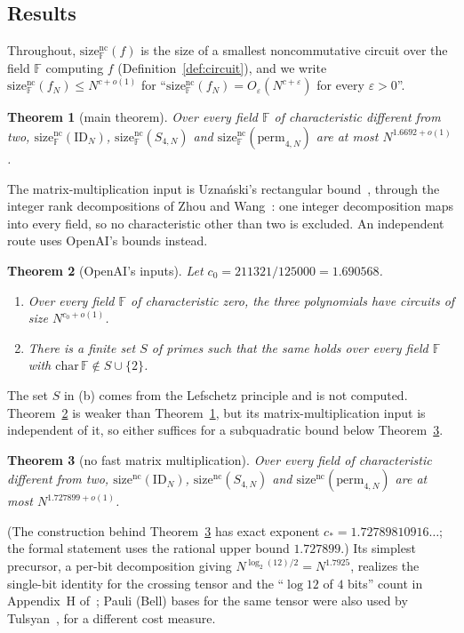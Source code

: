 \documentclass[11pt]{article}
\newtheorem{theorem}{Theorem}[section]
\theoremstyle{definition}
\theoremstyle{remark}
\newcommand{\F}{\mathbb{F}}
\newcommand{\ID}{\mathrm{ID}}
\newcommand{\size}{\mathrm{size}^{\mathrm{nc}}}
\begin{document}
\subsection{Results}
Throughout, $\size_\F(f)$ is the size of a smallest noncommutative circuit over the field $\F$ computing $f$
(Definition~\ref{def:circuit}), and we write $\size_\F(f_N)\le N^{c+o(1)}$ for
``$\size_\F(f_N)=O_\varepsilon(N^{c+\varepsilon})$ for every $\varepsilon>0$''.

\begin{theorem}[main theorem]\label{thm:main}
Over every field $\F$ of characteristic different from two, $\size_\F(\ID_N)$, $\size_\F(S_{4,N})$ and
$\size_\F(\mathrm{perm}_{4,N})$ are at most $N^{1.6692+o(1)}$.
\end{theorem}

The matrix-multiplication input is Uzna\'nski's rectangular bound~\cite{Uznanski2026}, through the integer rank
decompositions of Zhou and Wang~\cite{ZhouWang2026}: one integer decomposition maps into every field, so no
characteristic other than two is excluded. An independent route uses OpenAI's bounds instead.

\begin{theorem}[OpenAI's inputs]\label{thm:oairoute}
Let $c_0=211321/125000=1.690568$.
\begin{enumerate}[label=(\alph*)]
\item Over every field $\F$ of characteristic zero, the three polynomials have circuits of size $N^{c_0+o(1)}$.
\item There is a finite set $S$ of primes such that the same holds over every field $\F$ with
$\mathrm{char}\,\F\notin S\cup\{2\}$.
\end{enumerate}
\end{theorem}

The set $S$ in (b) comes from the Lefschetz principle and is not computed. Theorem~\ref{thm:oairoute} is weaker than
Theorem~\ref{thm:main}, but its matrix-multiplication input is independent of it, so either suffices for a
subquadratic bound below Theorem~\ref{thm:cubes}.

\begin{theorem}[no fast matrix multiplication]\label{thm:cubes}
Over every field of characteristic different from two, $\size(\ID_N)$, $\size(S_{4,N})$ and
$\size(\mathrm{perm}_{4,N})$ are at most $N^{1.727899+o(1)}$.
\end{theorem}
(The construction behind Theorem~\ref{thm:cubes} has exact exponent $c_\ast=1.72789810916\ldots$; the formal
statement uses the rational upper bound $1.727899$.) Its simplest precursor, a per-bit decomposition giving
$N^{\log_2(12)/2}=N^{1.7925}$, realizes the single-bit identity for the crossing tensor and the ``$\log 12$ of $4$
bits'' count in Appendix~H of~\cite{Anthropic3SAT}; Pauli (Bell) bases for the same tensor were also used by
Tulsyan~\cite{Tulsyan2026}, for a different cost measure.
\end{document}
